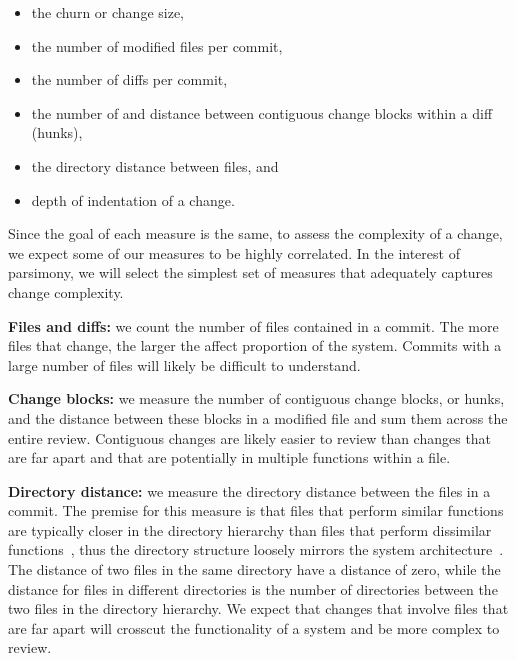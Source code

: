 \documentclass[11pt,twoside,a4paper]{article}
\begin{document}
\begin{itemize}

\item  the churn or change size, 

\item the number of modified files per commit,

\item the number of diffs per commit, 

\item the number of and distance between contiguous change blocks within a diff
(\ie hunks), 

\item the directory distance between files, and 

\item depth of indentation of a change. 

\end{itemize}

%
Since the goal of each measure is the same, to assess the complexity of a
change, we expect some of our measures to be highly correlated. 
In the interest of parsimony, we will select the simplest set of measures that
adequately captures change complexity. 

{\bf Files and diffs:} we count the number of files contained in a commit. The more files that change, the larger the affect proportion of the system. Commits with a large number of files will likely be difficult to understand. 

{\bf Change blocks:} we measure the number of contiguous change blocks, or
hunks, and the distance between these blocks in a modified file and sum them
across the entire review.  Contiguous changes  are likely easier to review than
changes that are far apart and that are potentially in multiple functions
within a file.  

{\bf Directory distance:} we measure the directory distance between the files
in a commit. The premise for this measure is that files that perform similar
functions are typically closer in the directory hierarchy than files that
perform dissimilar functions~\cite{Bowman1999ICSE}, thus the directory
structure loosely mirrors the system architecture~\cite{RigbySubTOSEM}. The
distance of two files in the same directory have a distance of zero, while the
distance for files in different directories is the number of directories
between the two files in the directory hierarchy.  We expect that changes that
involve files that are far apart will crosscut the functionality of a system
and be more complex to review.
\end{document}
